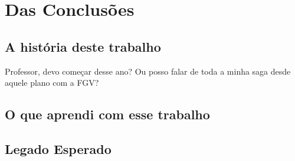 \chapter{Das Conclusões}
\label{ch:cxonclusoes}
\minitoc


\section{A história deste trabalho}
\label{sec:about-it}

Professor, devo começar desse ano? Ou posso falar de toda a minha saga desde aquele plano com a FGV?

\section{O que aprendi com esse trabalho}
\label{sec:lessions}

\section{Legado Esperado}
\label{sec:legacy}


